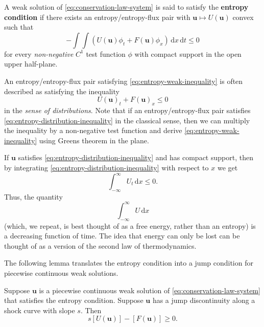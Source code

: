 \begin{Definition}
\label{def:entropy-condition}
A weak solution of \eqref{eq:conservation-law-system} is said to satisfy the \textbf{entropy condition} if there exists an entropy/entropy-flux pair with $\bm{u}\mapsto U(\bm{u})$ convex such that
\begin{equation}\label{eq:entropy-weak-inequality}
-\int\!\!\int(U(\bm{u})\phi_t+F(\bm{u})\phi_x)\,\mathrm{d}x\,\mathrm{d}t\leq0
\end{equation}
for every \emph{non-negative} $C^1$ test function $\phi$ with compact support in the open upper half-plane.
\end{Definition}

\begin{Remark}
\label{rem:entropy-distribution-interpretation}
An entropy/entropy-flux pair satisfying \eqref{eq:entropy-weak-inequality} is often described as satisfying the inequality
\begin{equation}\label{eq:entropy-distribution-inequality}
U(\bm{u})_t+F(\bm{u})_x\leq0
\end{equation}
in the \emph{sense of distributions}. Note that if an entropy/entropy-flux pair satisfies \eqref{eq:entropy-distribution-inequality} in the classical sense, then we can multiply the inequality by a non-negative test function and derive \eqref{eq:entropy-weak-inequality} using Green\textquotesingle s theorem in the plane.
\end{Remark}

\begin{Remark}
\label{rem:entropy-free-energy}
If $\bm{u}$ satisfies \eqref{eq:entropy-distribution-inequality} and has compact support, then by integrating \eqref{eq:entropy-distribution-inequality} with respect to $x$ we get
\begin{equation}\label{eq:total-entropy-time-derivative}
\int_{-\infty}^\infty U_t\,\mathrm{d}x\leq0.
\end{equation}
Thus, the quantity
\[
\int_{-\infty}^\infty U\,\mathrm{d}x
\]
(which, we repeat, is best thought of as a free energy, rather than an entropy) is a decreasing function of time. The idea that energy can only be lost can be thought of as a version of the second law of thermodynamics.
\end{Remark}

The following lemma translates the entropy condition into a jump condition for piecewise continuous weak solutions.

\begin{Lemma}
\label{lem:entropy-jump-condition}
Suppose $\bm{u}$ is a piecewise continuous weak solution of \eqref{eq:conservation-law-system} that satisfies the entropy condition. Suppose $\bm{u}$ has a jump discontinuity along a shock curve with slope $s$. Then
\begin{equation}\label{eq:entropy-jump-condition}
s[U(\bm{u})]-[F(\bm{u})]\geq0.
\end{equation}

\end{Lemma}

